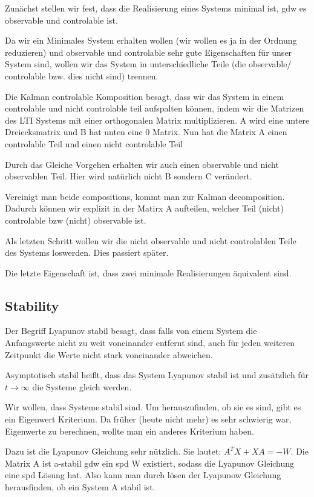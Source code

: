\documentclass[]{article}
\begin{document}
Zunächst stellen wir fest, dass die Realisierung eines Systems minimal ist, gdw es observable und controlable ist. 

Da wir ein Minimales System erhalten wollen (wir wollen es ja in der Ordnung reduzieren) und observable und controlable sehr gute Eigenschaften für unser System sind, wollen wir das System in unterschiedliche Teile (die observable/ controlable bzw. dies nicht sind) trennen. 

Die Kalman controlable Komposition besagt, dass wir das System in einem controlable und nicht controlable teil aufspalten können, indem wir die Matrizen des LTI Systems mit einer orthogonalen Matrix multiplizieren. A wird eine untere Dreiecksmatrix und B hat unten eine 0 Matrix. Nun hat die Matrix A einen controlable Teil und einen nicht controlable Teil

Durch das Gleiche Vorgehen erhalten wir auch einen observable und nicht observablen Teil. Hier wird natürlich nicht B sondern C verändert. 

Vereinigt man beide compositions, kommt man zur Kalman decomposition. Dadurch können wir explizit in der Matirx A aufteilen, welcher Teil (nicht) controlable bzw (nicht) observable ist. 

Als letzten Schritt wollen wir die nicht observable und nicht controlablen Teile des Systems loswerden. Dies passiert später. 

Die letzte Eigenschaft ist, dass zwei minimale Realisierungen äquivalent sind. 

\subsection{Stability}
 Der Begriff Lyapunov stabil besagt, dass falls von einem System die Anfangswerte nicht zu weit voneinander entfernt sind, auch für jeden weiteren Zeitpunkt die Werte nicht stark voneinander abweichen. 
 
 Asymptotisch stabil heißt, dass das System Lyapunov stabil ist und zusätzlich für $ t \rightarrow \infty$
 die Systeme gleich werden. 
 
 Wir wollen, dass Systeme stabil sind. Um herauszufinden, ob sie es sind, gibt es ein Eigenwert Kriterium. Da früher (heute nicht mehr) es sehr schwierig war, Eigenwerte zu berechnen, wollte man ein anderes Kriterium haben.
 
 Dazu ist die Lyapunov Gleichung sehr nützlich. Sie lautet: $A^T X + XA = -W$. Die Matrix A ist a-stabil gdw ein spd W existiert, sodass die Lyapunov Gleichung eine spd Lösung hat. Also kann man durch lösen der Lyapunow Gleichung herausfinden, ob ein System A stabil ist.
 
\end{document}
